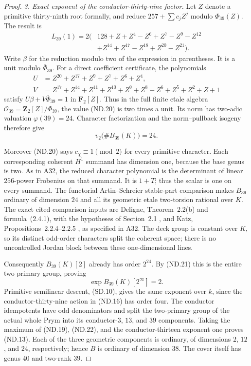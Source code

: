 \begin{proof}
\emph{3. Exact exponent of the conductor-thirty-nine factor.}
Let $Z$ denote a primitive thirty-ninth root formally, and
reduce $257+\sum c_jZ^j$ modulo $\Phi_{39}(Z)$. The result is
\[
\begin{aligned}
 L_{39}(1)=2\bigl(&128+Z+Z^4-Z^6+Z^7-Z^9-Z^{12}\\
                &+Z^{14}+Z^{17}-Z^{18}+Z^{20}-Z^{21}\bigr).
\end{aligned}
 \tag{ND.20}
\]
Write $\beta$ for the reduction modulo two of the expression
in parentheses. It is a unit modulo $\overline\Phi_{39}$.
For a direct coefficient certificate, the polynomials
\[
\begin{aligned}
 U&=Z^{20}+Z^{17}+Z^9+Z^7+Z^6+Z^4,\\
 V&=Z^{17}+Z^{14}+Z^{11}+Z^{10}+Z^9+Z^8
                         +Z^6+Z^5+Z^2+Z+1
\end{aligned}
\]
satisfy $U\beta+V\overline\Phi_{39}=1$ in $\mathbf F_2[Z]$.
Thus in the full finite etale algebra
$\mathcal O_{39}=\mathbf Z_2[Z]/\Phi_{39}$, the value (ND.20)
is two times a unit. Its norm has two-adic valuation
$\varphi(39)=24$. Character factorization and the norm--pullback
isogeny therefore give
\[
                       v_2\bigl(\#B_{39}(K)\bigr)=24.
 \tag{ND.21}
\]

Moreover (ND.20) says $c_\chi\equiv1\pmod2$ for every
primitive character. Each corresponding coherent $H^1$
summand has dimension one, because the base genus is two.
As in A32, the reduced character polynomial is the determinant
of linear $256$-power Frobenius on that summand. It is $1+T$;
thus the scalar is one on every summand. The functorial
Artin--Schreier stable-part comparison makes $B_{39}$ ordinary
of dimension $24$ and all its geometric etale two-torsion
rational over $K$. The exact cited comparison inputs are
Deligne, Theorem~2.2(b) and formula~(2.4.1), with the hypotheses
of Section~2.1 \cite{DeligneModP}, and Katz,
Propositions~2.2.4--2.2.5 \cite{KatzCongruence}, as specified
in A32. The deck group is constant over $K$, so its distinct
odd-order characters split the coherent space; there is no
uncontrolled Jordan block between these one-dimensional lines.

Consequently $B_{39}(K)[2]$ already has order $2^{24}$.
By (ND.21) this is the entire two-primary group, proving
\[
                        \exp B_{39}(K)[2^\infty]=2.
 \tag{ND.22}
\]
Primitive semilinear descent, (SD.10), gives the same exponent
over $k$, since the conductor-thirty-nine action in (ND.16)
has order four. The conductor idempotents have odd denominators
and split the two-primary group of the actual whole Prym into
its conductor-$3$, $13$, and $39$ components. Taking the maximum
of (ND.19), (ND.22), and the conductor-thirteen exponent one
proves (ND.13). Each of the three geometric components is
ordinary, of dimensions $2$, $12$, and $24$, respectively;
hence $B$ is ordinary of dimension $38$. The cover itself has
genus $40$ and two-rank $39$.


\end{proof}
